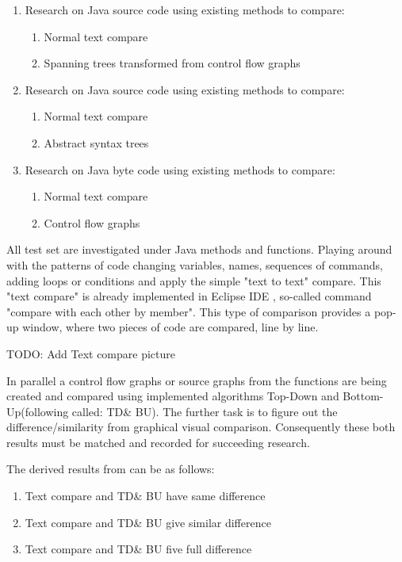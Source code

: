 \documentclass{report}
\begin{document}
\begin{enumerate}
  \item Research on Java source code using existing methods to compare:
  	\begin{enumerate}
   	 	\item Normal text compare
   		 \item Spanning trees transformed from control flow graphs
	 \end{enumerate}	
	 
  \item Research on Java source code using existing methods to compare:
  \begin{enumerate}
    \item Normal text compare 
    \item Abstract syntax trees
  \end{enumerate}
  
  \item Research on Java byte code using existing methods to compare:
  \begin{enumerate}
    \item Normal text compare 
    \item Control flow graphs
  \end{enumerate}
\end{enumerate}

All test set are investigated under Java methods and functions. Playing around with the patterns of code changing variables, names, sequences of commands, adding loops or conditions and apply the simple "text to text" compare. This "text compare" is already implemented in Eclipse IDE \cite{eclipse_site}, so-called command "compare with each other by member". This type of comparison provides a pop-up window, where two pieces of code are compared, line by line.

TODO: Add Text compare picture

In parallel a control flow graphs or source graphs from the functions are being created and compared using implemented algorithms Top-Down and Bottom-Up(following called: TD\& BU). The further task is to figure out the difference/similarity from graphical visual comparison. Consequently these both results must be matched and recorded for succeeding research.

The derived results from can be as follows: 
\begin{enumerate}
  \item Text compare and TD\& BU have same difference
  \item Text compare and TD\& BU give similar difference
  \item Text compare and TD\& BU five full difference
\end{enumerate}
\end{document}
